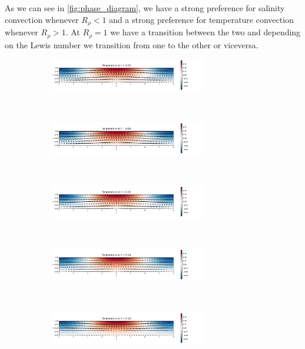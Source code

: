 \documentclass{article}
\begin{document}
As we can see in \cref{fig:phase_diagram}, we have a strong preference for salinity convection whenever $R_\rho<1$ and a strong preference for temperature convection whenever $R_\rho>1$. At $R_\rho=1$ we have a transition between the two and depending on the Lewis number we transition from one to the other or viceversa.
\begin{figure}[ht]
  \centering
  \begin{subfigure}{\textwidth}
    \centering
    \includegraphics[width=0.75\textwidth]{images/TS_1.pdf}
  \end{subfigure}\\
  \begin{subfigure}{\textwidth}
    \centering
    \includegraphics[width=0.75\textwidth]{images/TS_2.pdf}
  \end{subfigure}\\
  \begin{subfigure}{\textwidth}
    \centering
    \includegraphics[width=0.75\textwidth]{images/TS_3.pdf}
  \end{subfigure}\\
  \begin{subfigure}{\textwidth}
    \centering
    \includegraphics[width=0.75\textwidth]{images/TS_4.pdf}
  \end{subfigure}\\
  \begin{subfigure}{\textwidth}
    \centering
    \includegraphics[width=0.75\textwidth]{images/TS_5.pdf}

\end{subfigure}
\end{figure}
\end{document}
